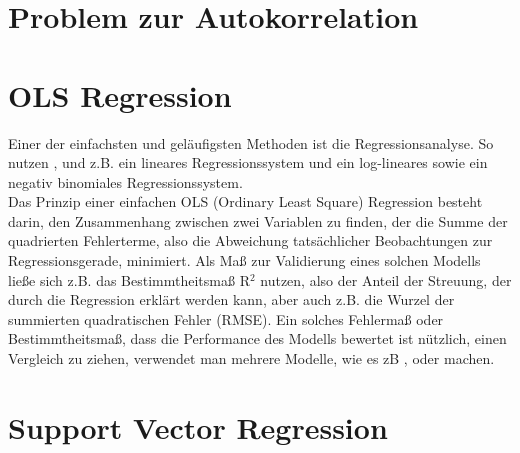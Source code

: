 \documentclass[a4paper,12pt]{thesis}
\begin{document}
\section{Problem zur Autokorrelation}

\section{OLS Regression}

Einer der einfachsten und geläufigsten Methoden ist die Regressionsanalyse. So nutzen \cite{Holmgren2017}, \cite{Alattar2021} und \cite{Gao2022} z.B. ein lineares Regressionssystem und \cite{Wessel2020} ein log-lineares sowie ein negativ binomiales Regressionssystem.\\
Das Prinzip einer einfachen OLS (Ordinary Least Square) Regression besteht darin, den Zusammenhang zwischen zwei Variablen zu finden, der die Summe der quadrierten Fehlerterme, also die Abweichung tatsächlicher Beobachtungen zur Regressionsgerade, minimiert. Als Maß zur Validierung eines solchen Modells ließe sich z.B. das Bestimmtheitsmaß R$^2$ nutzen, also der Anteil der Streuung, der durch die Regression erklärt werden kann, aber auch z.B. die Wurzel der summierten quadratischen Fehler (RMSE). Ein solches Fehlermaß oder Bestimmtheitsmaß, dass die Performance des Modells bewertet ist nützlich, einen Vergleich zu ziehen, verwendet man mehrere Modelle, wie es zB \cite{Holmgren2017}, \cite{Broucke2019} oder \cite{Gao2022} machen.

\section{Support Vector Regression}
\end{document}
